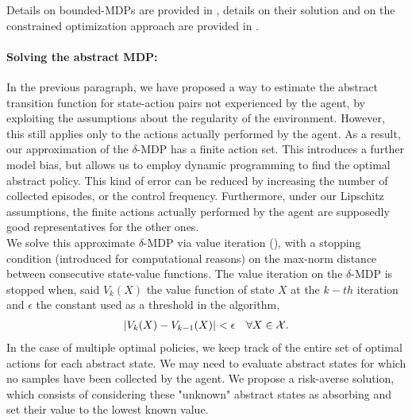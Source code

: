 Details on bounded-MDPs are provided in , details on their solution and on the constrained optimization approach are provided in . 

\paragraph{Solving the abstract MDP:}
In the previous paragraph, we have proposed a way to estimate the abstract transition function for state-action pairs not experienced by the agent, by exploiting the assumptions about the regularity of the environment. However, this still applies only to the actions actually performed by the agent. As a result, our approximation of the $\delta$-\ac{MDP} has a finite action set. This introduces a further model bias, but allows us to employ dynamic programming to find the optimal abstract policy. This kind of error can be reduced by increasing the number of collected episodes, or the control frequency. Furthermore, under our Lipschitz assumptions, the finite actions actually performed by the agent are supposedly good representatives for the other ones.\\
\newline
We solve this approximate $\delta$-\ac{MDP} via value iteration (), with a stopping condition (introduced for computational reasons) on the max-norm distance between consecutive state-value functions.
The value iteration on the $\delta$-\ac{MDP} is stopped when, said $V_k(X)$ the value function of state $X$ at the $k-th$ iteration and $\epsilon$ the constant used as a threshold in the algorithm, 
\begin{align}
|V_k(X) - V_{k-1}(X)| < \epsilon \quad \forall X \in \mathcal{X}.
\end{align}
In the case of multiple optimal policies, we keep track of the entire set of optimal actions for each abstract state.
We may need to evaluate abstract states for which no samples have been collected by the agent. We propose a risk-averse solution, which consists of considering these "unknown" abstract states as absorbing and set their value to the lowest known value. 

